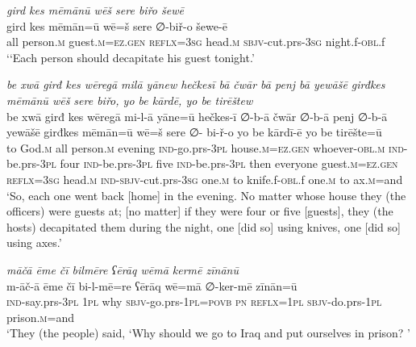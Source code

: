 \ea \label{BP.67}
\textit{gird kes mēmānū wēš sere biřo šewē} \\ 
\gll gird kes mēmān=ū wē=š sere ∅-biř-o šewe-ē \\ 
 all person\textsc{.m} guest\textsc{.m}\textsc{=ez.gen} \textsc{reflx}\textsc{=3sg} head\textsc{.m} \textsc{sbjv-}cut.prs\textsc{-3sg} night.f\textsc{-obl}.f \\ 
\glt `‘Each person should decapitate his guest tonight.'
\z 
 
\ea \label{BP.70}
\textit{be xwā girđ kes wēregā milā yānew hečkesī bā čwār bā penj bā yewāšē girđkes mēmānū wēš sere biřo, yo be kārdē, yo be tirēštew} \\ 
\gll be xwā girđ kes wēregā mi-l-ā yāne=ū hečkes-ī ∅-b-ā čwār ∅-b-ā penj ∅-b-ā yewāšē girđkes mēmān=ū wē=š sere ∅- bi-ř-o yo be kārdī-ē yo be tirēšte=ū \\ 
 to God\textsc{.m} all person\textsc{.m} evening \textsc{ind-}go.prs\textsc{-3pl} house\textsc{.m}\textsc{=ez.gen} whoever\textsc{-obl}\textsc{.m} \textsc{ind-}be.prs\textsc{-3pl} four \textsc{ind-}be.prs\textsc{-3pl} five \textsc{ind-}be.prs\textsc{-3pl} then everyone guest\textsc{.m}\textsc{=ez.gen} \textsc{reflx}\textsc{=3sg} head\textsc{.m} \textsc{ind-}\textsc{sbjv-}cut.prs\textsc{-3sg} one\textsc{.m} to knife.f\textsc{-obl}.f one\textsc{.m} to ax\textsc{.m}=and \\ 
\glt `So, each one went back [home] in the evening. No matter whose house they (the officers) were guests at; [no matter] if they were four or five [guests],  they  (the hosts) decapitated them during the night, one [did so] using knives, one [did so] using axes.'
\z 
 
\ea \label{BP.101}
\textit{māčā ēme čī bilmēre ʕērāq wēmā kermē zīnānū} \\ 
\gll m-āč-ā ēme čī bi-l-mē=re ʕērāq wē=mā ∅-ker-mē zīnān=ū \\ 
 \textsc{ind-}say.prs\textsc{-3pl} \textsc{1pl} why \textsc{sbjv-}go.prs\textsc{-\textsc{1pl}}\textsc{=\textsc{povb}} \textsc{pn} \textsc{reflx}\textsc{=\textsc{1pl}} \textsc{sbjv-}do.prs\textsc{-\textsc{1pl}} prison\textsc{.m}=and \\ 
\glt `They (the people) said, ‘Why should we go to Iraq and put ourselves in   prison? '
\z 
 
